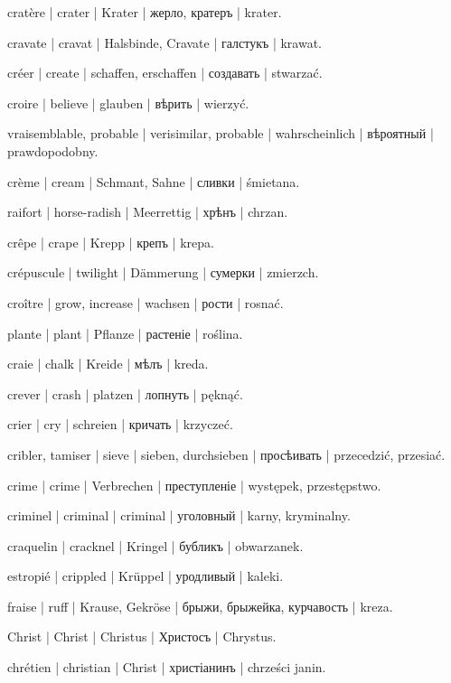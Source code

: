 \begin{outdent}{1em}
cratère | crater | Krater | жерло, кратеръ | krater.

cravate | cravat | Halsbinde, Cravate | галстукъ | krawat.

créer | create | schaffen, erschaffen | создавать | stwarzać.

croire | believe | glauben | вѣрить | wierzyć.

\uvsubentry{}
vraisemblable, probable | verisimilar, probable | wahrscheinlich | вѣроятный | prawdopodobny.

crème | cream | Schmant, Sahne | сливки | śmietana.

raifort | horse-radish | Meerrettig | хрѣнъ | chrzan.

crêpe | crape | Krepp | крепъ | krepa.

crépuscule | twilight | Dämmerung | сумерки | zmierzch.

croître | grow, increase | wachsen | рости | rosnać.

\uvsubentry{}
plante | plant | Pflanze | растеніе | roślina.

craie | chalk | Kreide | мѣлъ | kreda.

crever | crash | platzen | лопнуть | pęknąć.

crier | cry | schreien | кричать | krzyczeć.

cribler, tamiser | sieve | sieben, durchsieben | просѣивать | przecedzić, przesiać.

crime | crime | Verbrechen | преступленіе | występek, przestępstwo.

criminel | criminal | criminal | уголовный | karny, kryminalny.

craquelin | cracknel | Kringel | бубликъ | obwarzanek.

estropié | crippled | Krüppel | уродливый | kaleki.

fraise | ruff | Krause, Gekröse | брыжи, брыжейка, курчавость | kreza.

Christ | Christ | Christus | Христосъ | Chrystus.

\uvsubentry{}
chrétien | christian | Christ | христіанинъ | chrześci janin.


\end{outdent}
